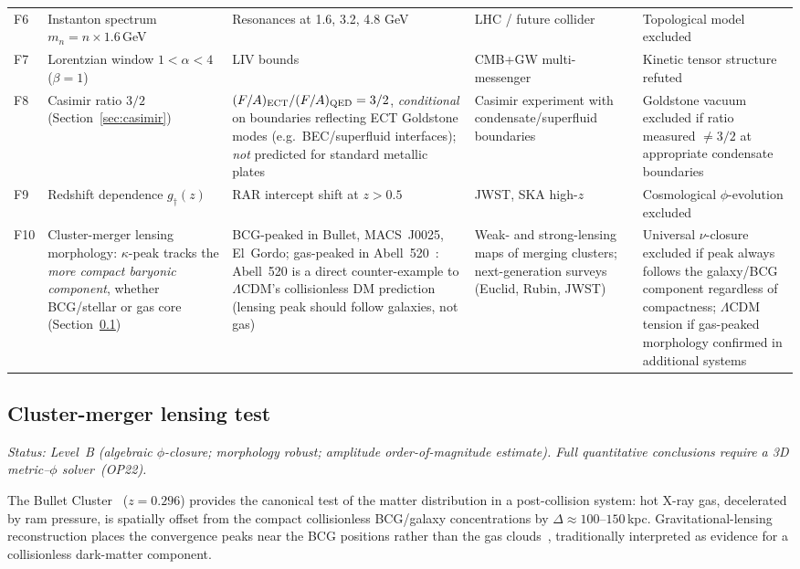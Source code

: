 \documentclass[11pt,a4paper]{article}
\numberwithin{equation}{section}
\begin{document}
\begin{longtable}{@{}p{}p{}p{}p{}p{}@{}}
F6 & Instanton spectrum $m_n=n\times1.6\,$GeV &
Resonances at 1.6, 3.2, 4.8 GeV &
LHC / future collider &
Topological model excluded \\

F7 & Lorentzian window $1<\alpha<4$ ($\beta=1$) &
LIV bounds &
CMB+GW multi-messenger &
Kinetic tensor structure refuted \\

F8 & Casimir ratio $3/2$ (Section~\ref{sec:casimir}) &
$(F/A)_{\rm ECT}/(F/A)_{\rm QED}=3/2$, \emph{conditional} on
boundaries reflecting ECT Goldstone modes (e.g.\ BEC/superfluid
interfaces); \emph{not} predicted for standard metallic plates &
Casimir experiment with condensate/superfluid boundaries &
Goldstone vacuum excluded if ratio measured $\neq 3/2$ at
appropriate condensate boundaries \\

F9 & Redshift dependence $g_\dagger(z)$ &
RAR intercept shift at $z > 0.5$ &
JWST, SKA high-$z$ &
Cosmological $\phi$-evolution excluded \\

F10 & Cluster-merger lensing morphology: $\kappa$-peak
  tracks the \emph{more compact baryonic component},
  whether BCG/stellar or gas core
  (Section~\ref{sec:bullet_cluster}) &
BCG-peaked in Bullet, MACS~J0025, El~Gordo;
  gas-peaked in Abell~520~\cite{Mahdavi2007,Jee2012}:
  Abell~520 is a direct counter-example to $\Lambda$CDM's
  collisionless DM prediction (lensing peak should follow
  galaxies, not gas) &
Weak- and strong-lensing maps of merging clusters;
  next-generation surveys (Euclid, Rubin, JWST) &
Universal $\nu$-closure excluded if peak always follows
  the galaxy/BCG component regardless of compactness;
  $\Lambda$CDM tension if gas-peaked morphology confirmed
  in additional systems \\

\bottomrule
\end{longtable}

\subsection{Cluster-merger lensing test}
\label{sec:bullet_cluster}

\textit{Status: Level~B (algebraic $\phi$-closure; morphology
robust; amplitude order-of-magnitude estimate).
Full quantitative conclusions require a 3D metric--$\phi$
solver~(OP22).}

The Bullet Cluster~\cite{Clowe2006,Markevitch2004} ($z=0.296$)
provides the canonical test of the matter distribution in a
post-collision system: hot X-ray gas, decelerated by ram
pressure, is spatially offset from the compact collisionless
BCG/galaxy concentrations by $\Delta\approx100$--$150\,$kpc.
Gravitational-lensing reconstruction places the convergence
peaks near the BCG positions rather than the gas
clouds~\cite{Paraficz2016}, traditionally interpreted as
evidence for a collisionless dark-matter component.
\end{document}
